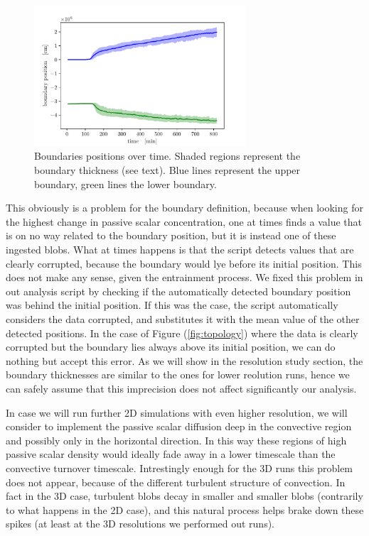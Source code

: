 \begin{figure}[b!]
\centering
\includegraphics[width=0.7\textwidth]{./img/boundpos.pdf}
\caption{Boundaries positions over time. Shaded regions represent the boundary thickness (see text). Blue lines represent the upper boundary, green lines the lower boundary.}
\label{fig:boundpos}
\end{figure}
This obviously is a problem for the boundary definition, because when looking for the highest change in passive scalar concentration, one at times finds a value that is on no way related to the boundary position, but it is instead one of these ingested blobs. What at times happens is that the script detects values that are clearly corrupted, because the boundary would lye before its initial position. This does not make any sense, given the entrainment process. We fixed this problem in out analysis script by checking if the automatically detected boundary position was behind the initial position. If this was the case, the script automatically considers the data corrupted, and substitutes it with the mean value of the other detected positions. In the case of Figure (\ref{fig:topology}) where the data is clearly corrupted but the boundary lies always above its initial position, we can do nothing but accept this error. As we will show in the resolution study section, the boundary thicknesses are similar to the ones for lower reolution runs, hence we can safely assume that this imprecision does not affect significantly our analysis. 

In case we will run further 2D simulations with even higher resolution, we will consider to implement the passive scalar diffusion deep in the convective region and possibly only in the horizontal direction. In this way these regions of high passive scalar density would ideally fade away in a lower timescale than the convective turnover timescale. Intrestingly enough for the 3D runs this problem does not appear, because of the different turbulent structure of convection. In fact in the 3D case, turbulent blobs decay in smaller and smaller blobs (contrarily to what happens in the 2D case), and this natural process helps brake down these spikes (at least at the 3D resolutions we performed out runs).


